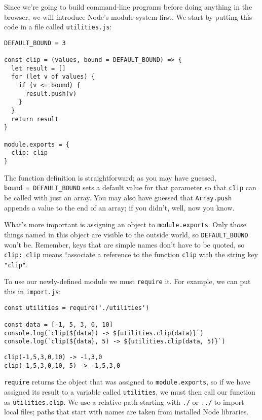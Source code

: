 Since we're going to build command-line programs before doing anything in the browser,
we will introduce Node's module system first.
We start by putting this code in a file called \texttt{utilities.js}:

\begin{verbatim}
DEFAULT_BOUND = 3

const clip = (values, bound = DEFAULT_BOUND) => {
  let result = []
  for (let v of values) {
    if (v <= bound) {
      result.push(v)
    }
  }
  return result
}

module.exports = {
  clip: clip
}
\end{verbatim}

The function definition is straightforward;
as you may have guessed, \texttt{bound\ =\ DEFAULT\_BOUND} sets a default value for that parameter
so that \texttt{clip} can be called with just an array.
You may also have guessed that \texttt{Array.push} appends a value to the end of an array;
if you didn't,
well,
now you know.

What's more important is assigning an object to \texttt{module.exports}.
Only those things named in this object are visible to the outside world,
so \texttt{DEFAULT\_BOUND} won't be.
Remember,
keys that are simple names don't have to be quoted,
so \texttt{clip:\ clip} means ``associate a reference to the function \texttt{clip} with the string key \texttt{"clip"}.

To use our newly-defined module we must \texttt{require} it.
For example,
we can put this in \texttt{import.js}:

\begin{verbatim}
const utilities = require('./utilities')

const data = [-1, 5, 3, 0, 10]
console.log(`clip(${data}) -> ${utilities.clip(data)}`)
console.log(`clip(${data}, 5) -> ${utilities.clip(data, 5)}`)
\end{verbatim}

\begin{verbatim}
clip(-1,5,3,0,10) -> -1,3,0
clip(-1,5,3,0,10, 5) -> -1,5,3,0
\end{verbatim}

\texttt{require} returns the object that was assigned to \texttt{module.exports},
so if we have assigned its result to a variable called \texttt{utilities},
we must then call our function as \texttt{utilities.clip}.
We use a relative path starting with \texttt{./} or \texttt{../} to import local files;
paths that start with names are taken from installed Node libraries.

